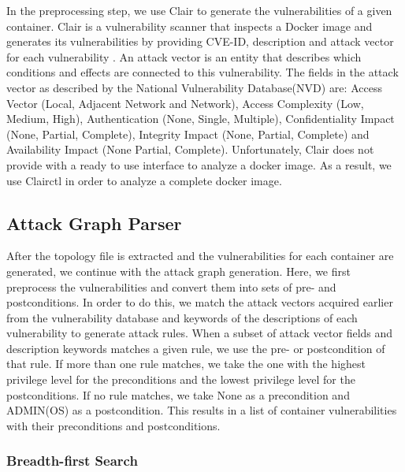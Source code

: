 In the preprocessing step, we use Clair to generate the vulnerabilities of a given container. Clair is a vulnerability scanner that inspects a Docker image and generates its vulnerabilities by providing CVE-ID, description and attack vector for each vulnerability \cite{clair}. An attack vector is an entity that describes which conditions and effects are connected to this vulnerability. The fields in the attack vector as described by the National Vulnerability Database(NVD) \cite{booth2013national} are: Access Vector (Local, Adjacent Network and Network), Access Complexity (Low, Medium, High), Authentication (None, Single, Multiple), Confidentiality Impact (None, Partial, Complete), Integrity Impact (None, Partial, Complete) and Availability Impact (None Partial, Complete). Unfortunately, Clair does not provide with a ready to use interface to analyze a docker image. As a result, we use Clairctl \cite{clairctl} in order to analyze a complete docker image.


\subsection{Attack Graph Parser}
\label{chap:attack_graph_p}

After the topology file is extracted and the vulnerabilities for each container are generated, we continue with the attack graph generation. Here, we first preprocess the vulnerabilities and convert them into sets of pre- and postconditions. In order to do this, we match the attack vectors acquired earlier from the vulnerability database and keywords of the descriptions of each vulnerability to generate attack rules. When a subset of attack vector fields and description keywords matches a given rule, we use the pre- or postcondition of that rule. If more than one rule matches, we take the one with the highest privilege level for the preconditions and the lowest privilege level for the postconditions. If no rule matches, we take None as a precondition and ADMIN(OS) as a postcondition. This results in a list of container vulnerabilities with their preconditions and postconditions.

\subsubsection{Breadth-first Search}
\label{chap:bfs}

